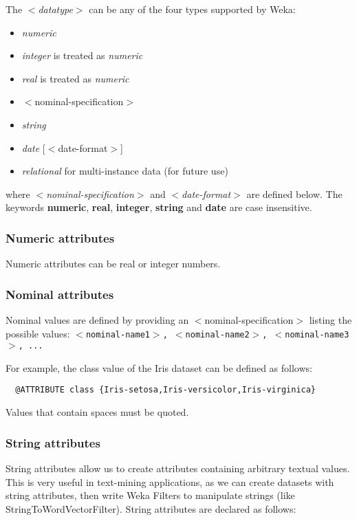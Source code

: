 The \textit{$<$datatype$>$} can be any of the four types supported by Weka:
\begin{itemize}
	\item \textit{numeric}
	\item \textit{integer} is treated as \textit{numeric}
	\item \textit{real} is treated as \textit{numeric}
	\item $<$nominal-specification$>$
	\item \textit{string}
	\item \textit{date} [$<$date-format$>$]
	\item \textit{relational} for multi-instance data (for future use)
\end{itemize}

where \textit{$<$nominal-specification$>$} and \textit{$<$date-format$>$} are defined below. The keywords \textbf{numeric}, \textbf{real}, \textbf{integer}, \textbf{string} and \textbf{date} are case insensitive.


\subsubsection*{Numeric attributes}
Numeric attributes can be real or integer numbers. 


\subsubsection*{Nominal attributes}
Nominal values are defined by providing an $<$nominal-specification$>$ listing the possible values: \texttt{{$<$nominal-name1$>$, $<$nominal-name2$>$, $<$nominal-name3$>$, ...}}

For example, the class value of the Iris dataset can be defined as follows:

\begin{verbatim}
  @ATTRIBUTE class {Iris-setosa,Iris-versicolor,Iris-virginica}
\end{verbatim}

Values that contain spaces must be quoted. 


\subsubsection*{String attributes}
String attributes allow us to create attributes containing arbitrary textual values. This is very useful in text-mining applications, as we can create datasets with string attributes, then write Weka Filters to manipulate strings (like StringToWordVectorFilter). String attributes are declared as follows:

